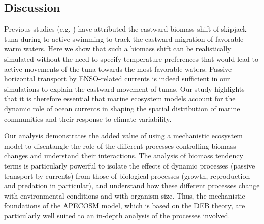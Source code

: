 \subsection{Discussion}

Previous studies (e.g. \citealp{lehodeyNinoSouthernOscillation1997, lehodeyPelagicEcosystemTropical2001}) have attributed the eastward biomass shift of skipjack tuna during \nino{} to active swimming to track the eastward migration of favorable warm waters. Here we show that such a biomass shift can be realistically simulated without the need to specify temperature preferences that would lead to active movements of the tuna towards the most favorable waters. Passive horizontal transport by ENSO-related currents is indeed sufficient in our simulations to explain the eastward movement of tunas. Our study highlights that it is therefore essential that marine ecosystem models account for the dynamic role of ocean currents in shaping the spatial distribution of marine communities and their response to climate variability.

Our analysis demonstrates the added value of using a mechanistic ecosystem model to disentangle the role of the different processes controlling biomass changes and understand their interactions. The analysis of biomass tendency terms is particularly powerful to isolate the effects of dynamic processes (passive transport by currents) from those of biological processes (growth, reproduction and predation in particular), and understand how these different processes change with environmental conditions and with organism size. Thus, the mechanistic foundations of the APECOSM model, which is based on the DEB theory, are particularly well suited to an in-depth analysis of the processes involved.


